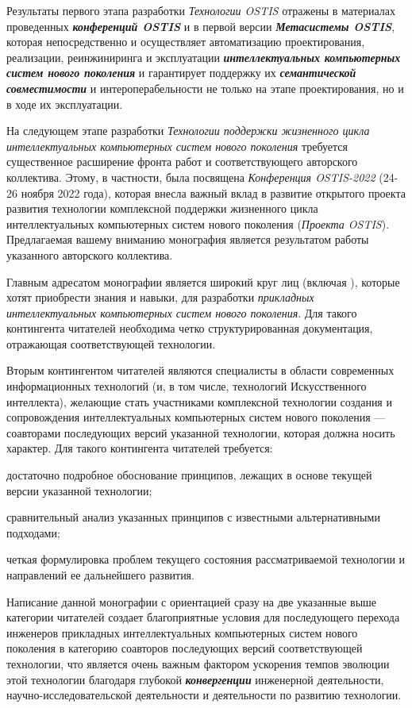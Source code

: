\begin{partbacktext}
Результаты первого этапа разработки \textit{Технологии OSTIS} отражены в материалах проведенных \textbf{\textit{конференций OSTIS}} и в первой версии \textbf{\textit{Метасистемы OSTIS}}, которая непосредственно и осуществляет автоматизацию проектирования, реализации, реинжиниринга и эксплуатации \textbf{\textit{интеллектуальных компьютерных систем нового поколения}} и гарантирует поддержку их \textbf{\textit{семантической совместимости}} и интероперабельности не только на этапе проектирования, но и в ходе их эксплуатации.

На следующем этапе разработки \textit{Технологии поддержки жизненного цикла интеллектуальных компьютерных систем нового поколения} требуется существенное расширение фронта работ и соответствующего авторского коллектива. Этому, в частности, была посвящена \textit{Конференция OSTIS-2022} (24-26 ноября 2022 года), которая внесла важный вклад в развитие открытого проекта развития технологии комплексной поддержки жизненного цикла интеллектуальных компьютерных систем нового поколения (\textit{Проекта OSTIS}). Предлагаемая вашему вниманию монография является результатом работы указанного авторского коллектива.

Главным адресатом монографии является широкий круг лиц (включая ), которые хотят  приобрести знания и навыки, для разработки \textit{прикладных интеллектуальных компьютерных систем нового поколения}. Для такого контингента читателей необходима четко структурированная документация, отражающая   соответствующей технологии.

Вторым контингентом читателей являются специалисты в области современных информационных технологий (и, в том числе, технологий Искусственного интеллекта), желающие стать участниками   комплексной технологии создания и сопровождения интеллектуальных компьютерных систем нового поколения --- соавторами последующих версий указанной технологии, которая должна носить  характер. Для такого контингента читателей требуется:
\begin{textitemize}
	\item достаточно подробное обоснование принципов, лежащих в основе текущей версии указанной технологии; 
	\item сравнительный анализ указанных принципов с известными альтернативными подходами; 
	\item четкая формулировка проблем текущего состояния рассматриваемой технологии и направлений ее дальнейшего развития.
\end{textitemize}

Написание данной монографии с ориентацией сразу на две указанные выше категории читателей создает благоприятные условия для последующего перехода инженеров прикладных интеллектуальных компьютерных систем нового поколения в категорию соавторов последующих версий соответствующей технологии, что является очень важным фактором ускорения темпов эволюции этой технологии благодаря глубокой \textbf{\textit{конвергенции}} инженерной деятельности, научно-исследовательской деятельности и деятельности по развитию технологии.

\end{partbacktext}